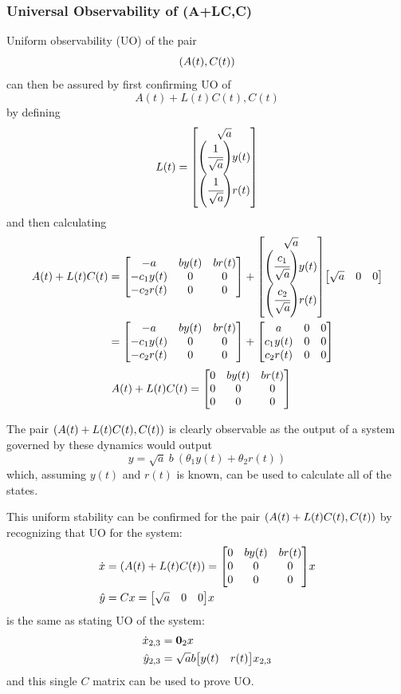 \documentclass[letter]{article}
\begin{document}
\subsubsection{Universal Observability of (A+LC,C)}
Uniform observability (UO) of the pair $$\qty(A(t), C(t))$$ can then be assured by first confirming UO of $$A(t) + L(t) C(t), C(t)$$ by defining
\begin{equation}
	L(t) = \mqty[\sqrt{a}\\
				 \qty(\cfrac{1}{\sqrt{a}})y(t)\\
				 \qty(\cfrac{1}{\sqrt{a}})r(t)]
\end{equation}
and then calculating
\begin{align}
	A(t) + L(t) C(t)
	&= \mqty[-a & b y(t) & b r(t)\\
			-c_1 y(t) & 0 &0\\
			-c_2 r(t) & 0 &0]
	+ \mqty[\sqrt{a}\\
			\qty(\cfrac{c_1}{\sqrt{a}})y(t)\\
			\qty(\cfrac{c_2}{\sqrt{a}})r(t)]
	  \mqty[\sqrt{a} & 0 & 0]\\
	&= \mqty[-a & b y(t) & b r(t)\\
			-c_1 y(t) & 0 &0\\
			-c_2 r(t) & 0 &0]
	+  \mqty[a & 0 & 0\\
			c_1 y(t) & 0 &0\\
			c_2 r(t) & 0 &0]
\end{align}
\begin{align}
	A(t) + L(t) C(t)
	&= \mqty[0 & b y(t) & b r(t)\\
			0 & 0 &0\\
			0 & 0 &0]
\end{align}

The pair $\qty(A(t) + L(t) C(t), C(t))$ is clearly observable as the output of a system governed by these dynamics would output
\begin{equation}
	y = \sqrt{a} \ b \ (\theta_1 y(t) + \theta_2 r(t))
\end{equation}
which, assuming $y(t)$ and $r(t)$ is known, can be used to calculate all of the states.

This uniform stability can be confirmed for the pair $\qty(A(t) + L(t) C(t), C(t))$ by recognizing that UO for the system:
\begin{equation}
	\begin{aligned}
		\dot{x}
		&= (A(t) + L(t) C(t))
		= \mqty[0 & b y(t) & b r(t)\\
				0 & 0 &0\\
				0 & 0 &0] x\\
		\hat{y}
		&= C x = \mqty[\sqrt{a} & 0 & 0] x
	\end{aligned}
\end{equation}
is the same as stating UO of the system:
\begin{equation}
	\begin{aligned}
		\dot{x}_{2,3}
		&= \vb{0}_2 x\\
		\hat{y}_{2,3}
		&= \sqrt{a} b \mqty[y(t) & r(t)] x_{2,3}
	\end{aligned}
\end{equation}
and this single $C$ matrix can be used to prove UO.\\
\end{document}
